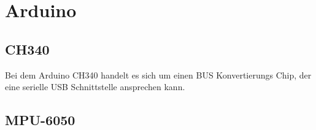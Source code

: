 \section{Arduino}


\subsection{CH340}
Bei dem Arduino CH340 handelt es sich um einen BUS Konvertierungs Chip, der eine serielle USB Schnittstelle ansprechen kann.

\cite{CH340}
\subsection{ MPU-6050}